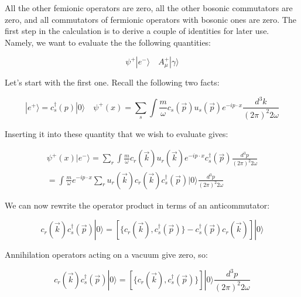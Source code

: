 \documentclass[a4]{article}
\begin{document}
\begin{framed}
        All the other femionic operators are zero, all the other bosonic commutators are zero, and all commutators of fermionic operators with bosonic ones are zero. The first step
        in the calculation is to derive a couple of identities for later use. Namely, we want to evaluate the the following quantities:

        \begin{equation}
            \psi^{+} | e^{-} \rangle \quad A_{\mu}^{+} | \gamma \rangle
        \end{equation}

        Let's start with the first one. Recall the following two facts:

        \begin{equation}
            | e^{+} \rangle = c_{s}^{\dag} (p) | 0 \rangle \quad \psi^{+} (x) = \sum_{s} \int \frac{m}{\omega} c_{s} (\vec{p}) u_{s} (\vec{p}) e^{-i p \cdot x} \frac{d^3k}{(2 \pi)^2 2 \omega}
        \end{equation}

        Inserting it into these quantity that we wish to evaluate gives:

        \begin{equation}
            \begin{aligned}
                \psi^{+} (x) | e^{-} \rangle = \sum_{r} \int \frac{m}{\omega} c_{r} (\vec{k}) u_{r} (\vec{k}) e^{-i p \cdot x} c_{s}^{\dag} (\vec{p}) \frac{d^3 p}{(2 \pi)^2 2 \omega} \\
                = \int \frac{m}{\omega} e^{-i p \cdot x} \sum_{r} u_{r} (\vec{k}) c_{r} (\vec{k}) c_{s}^{\dag} (\vec{p})  | 0 \rangle \frac{d^3 p}{(2 \pi)^2 2 \omega}
            \end{aligned}
        \end{equation}

        We can now rewrite the operator product in terms of an anticommutator:

        \begin{equation}
            c_{r} (\vec{k}) c_{s}^{\dag} (\vec{p}) | 0 \rangle = [\{ c_{r} (\vec{k}) , c_{s}^{\dag} (\vec{p}) \} - c_{s}^{\dag} (\vec{p}) c_{r} (\vec{k})] | 0 \rangle
        \end{equation}

        Annihilation operators acting on a vacuum give zero, so:

        \begin{equation}
            c_{r} (\vec{k}) c_{s}^{\dag} (\vec{p}) | 0 \rangle = [\{ c_{r} (\vec{k}) , c_{s}^{\dag} (\vec{p}) \}] | 0 \rangle \frac{d^3 p}{(2 \pi)^2 2 \omega}
        \end{equation}


\end{framed}
\end{document}
